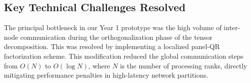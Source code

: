 \subsection{Key Technical Challenges Resolved}
The principal bottleneck in our Year 1 prototype was the high volume of inter-node communication during the orthogonalization phase of the tensor decomposition. This was resolved by implementing a localized panel-QR factorization scheme. This modification reduced the global communication steps from $O(N)$ to $O(\log N)$, where $N$ is the number of processing ranks, directly mitigating performance penalties in high-latency network partitions.
